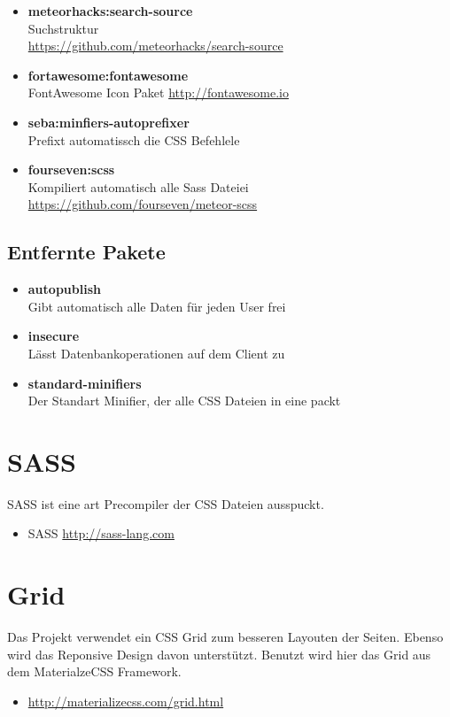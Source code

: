 \documentclass[Info_VK_Website_Dokumentation.tex]{subfiles}
\begin{document}
\begin{itemize}
 	\item \textbf{meteorhacks:search-source}\\
 	Suchstruktur \\
 	\small \url{https://github.com/meteorhacks/search-source}

 	\item \textbf{fortawesome:fontawesome}\\
 	FontAwesome Icon Paket
 	\small \url{http://fontawesome.io} 

 	\item \textbf{seba:minfiers-autoprefixer}\\
 	Prefixt automatissch die CSS Befehlele

 	\item \textbf{fourseven:scss}\\
 	Kompiliert automatisch alle Sass Dateiei \\
 	\small \url{https://github.com/fourseven/meteor-scss} 
 \end{itemize} 

\subsection{Entfernte Pakete}

\begin{itemize}
 	\item \textbf{autopublish}\\
 	Gibt automatisch alle Daten für jeden User frei
 	\item \textbf{insecure}\\
 	Lässt Datenbankoperationen auf dem Client zu
 	\item \textbf{standard-minifiers}\\
 	Der Standart Minifier, der alle CSS Dateien in eine packt
 \end{itemize} 



\section{SASS}

SASS ist eine art Precompiler der CSS Dateien ausspuckt.

\begin{itemize}
	\item SASS \url{http://sass-lang.com} 
\end{itemize}

\section{Grid}

Das Projekt verwendet ein CSS Grid zum besseren Layouten der Seiten. Ebenso wird das Reponsive Design davon unterstützt. Benutzt wird hier das Grid aus dem MaterialzeCSS Framework.

\begin{itemize}
 	\item \url{http://materializecss.com/grid.html} 
\end{itemize} 
\end{document}
